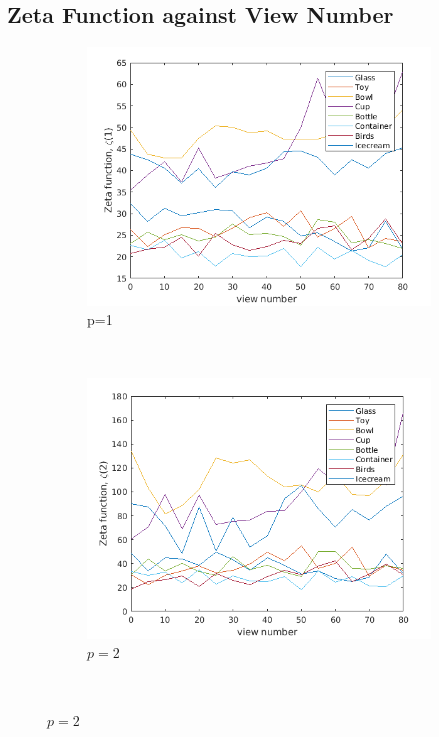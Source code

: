 \documentclass[10pt,a4paper]{article}
\begin{document}
\subsection{Zeta Function against View Number}
\begin{figure}[H]
	\centering
	\begin{subfigure}[b]{0.5\textwidth}
		\includegraphics[width= \textwidth]{images/zeta-viewnump1.png}
		\caption{p=1}
		\label{}
	\end{subfigure}~
	\begin{subfigure}[b]{0.5\textwidth}
		\includegraphics[width= \textwidth]{images/zeta-viewnump2.png}
		\caption{$p=2$}
		\label{}
	\end{subfigure}\\

\end{figure}
\end{document}
